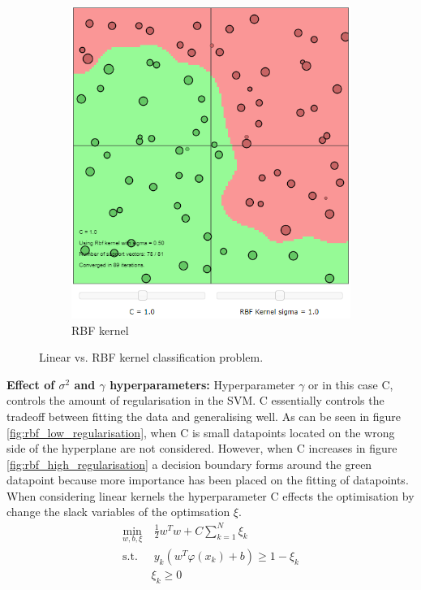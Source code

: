 \documentclass{article}
\begin{document}
\begin{figure}[h]
\begin{subfigure}[b]{0.3\textwidth}
                 \includegraphics[width=\textwidth]{Assignment 1/figures/linear_vs_rbf_2.png}
                 \caption{RBF kernel}
                 \label{fig:linear_kernel_vs_rbf_2}
             \end{subfigure}
             \hspace{0.15\textwidth}
            \caption{Linear vs. RBF kernel classification problem. }
            \label{fig:linearvsrbf}
        \end{figure}
        
        
        \noindent\textbf{Effect of $\sigma^2$ and $\gamma$ hyperparameters:}\newline 
        Hyperparameter $\gamma$ or in this case C, controls the amount of regularisation in the SVM. C essentially controls the tradeoff between fitting the data and generalising well. As can be seen in figure \ref{fig:rbf_low_regularisation}, when C is small datapoints located on the wrong side of the hyperplane are not considered. However, when C increases in figure \ref{fig:rbf_high_regularisation} a decision boundary forms around the green datapoint because more importance has been placed on the fitting of datapoints. 
        When considering linear kernels the hyperparameter C effects the optimisation by change the slack variables of the optimsation $\xi$. 
        \begin{equation}\label{eq:linearkernel}
        \begin{split}
            \min_{w,b,\xi} & \ \frac{1}{2} w^T w + C \sum^N_{k=1} \xi_k \\
            \text{s.t.} & \ y_k(w^T \varphi(x_k) + b)\geq 1 - \xi_k \\ 
                &\xi_k \geq 0
        \end{split}
        \end{equation}
        
\end{document}
